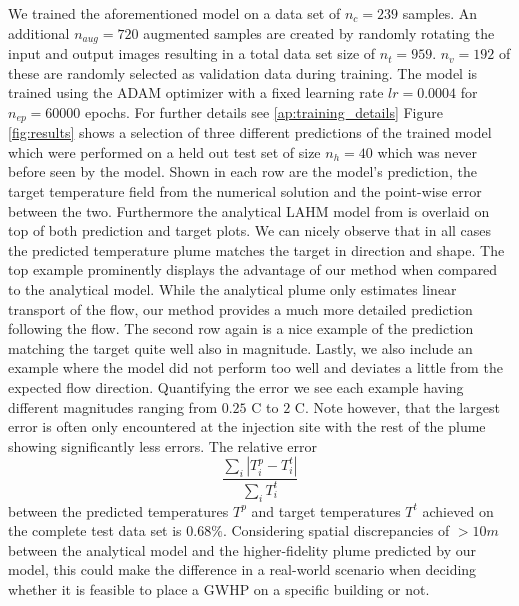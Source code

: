\documentclass{article} %
\begin{document}

We trained the aforementioned model on a data set of $n_c=239$ samples. An additional $n_{aug} = 720$ augmented samples are created by randomly rotating the input and output images resulting in a total data set size of $n_t = 959$. $n_v=192$ of these are randomly selected as validation data during training.
The model is trained using the ADAM optimizer \citep{adam} with a fixed learning rate $lr=0.0004$ for $n_{ep}=60000$ epochs.
For further details see \ref{ap:training_details}
Figure \ref{fig:results} shows a selection of three different predictions of the trained model which were performed on a held out test set of size $n_h=40$ which was never before seen by the model.
Shown in each row are the model's prediction, the target temperature field from the numerical solution and the point-wise error between the two.
Furthermore the analytical LAHM model from \citet{Pophillat2020} is overlaid on top of both prediction and target plots.
We can nicely observe that in all cases the predicted temperature plume matches the target in direction and shape.
The top example prominently displays the advantage of our method when compared to the analytical model.
While the analytical plume only estimates linear transport of the flow, our method provides a much more detailed prediction following the flow.
The second row again is a nice example of the prediction matching the target quite well also in magnitude.
Lastly, we also include an example where the model did not perform too well and deviates a little from the expected flow direction.
Quantifying the error we see each example having different magnitudes ranging from $0.25$ \degree C to $2$ \degree C.
Note however, that the largest error is often only encountered at the injection site with the rest of the plume showing significantly less errors.
The relative error
\begin{equation*}
    \frac{\sum_i \left| T^p_i - T^t_i \right|}{\sum_i T^t_i}
\end{equation*}
between the predicted temperatures $T^p$ and target temperatures $T^t$ achieved on the complete test data set is $0.68 \%$.
Considering spatial discrepancies of $>10m$ between the analytical model and the higher-fidelity plume predicted by our model, this could make the difference in a real-world scenario when deciding whether it is feasible to place a GWHP on a specific building or not.
\end{document}
